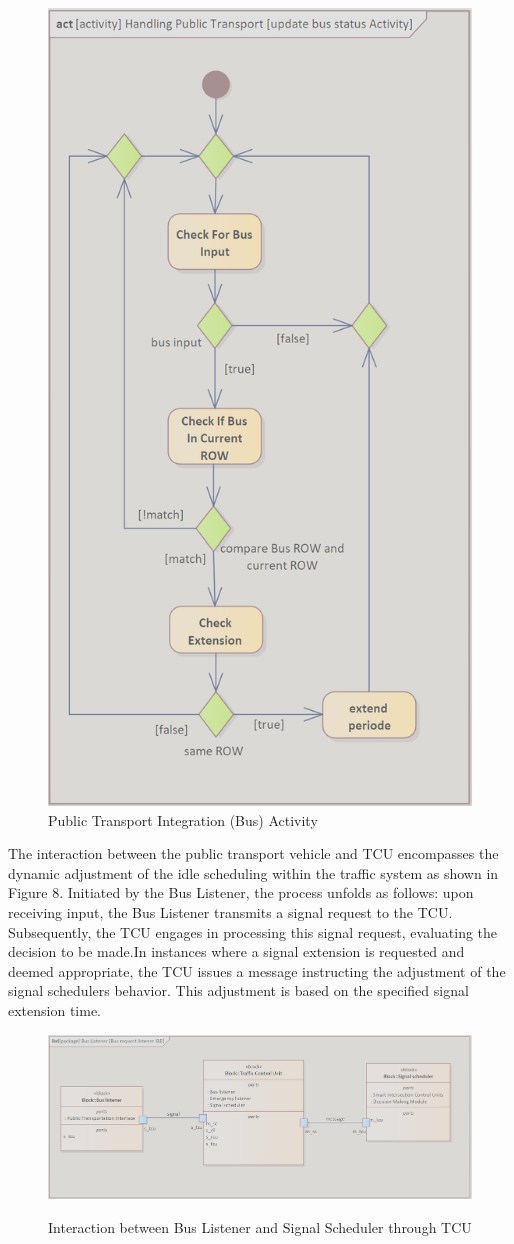 \begin{figure}
\centering
\includegraphics[width=0.5\linewidth]{images/process_1_activity.png}
\caption{Public Transport Integration (Bus) Activity}
\label{fig:bus_listener}
\end{figure}
The interaction between the public transport vehicle and TCU encompasses the dynamic adjustment of the idle scheduling within the traffic system as shown in Figure 8. Initiated by the Bus Listener, the process unfolds as follows: upon receiving input, the Bus Listener transmits a signal request to the TCU. Subsequently, the TCU engages in processing this signal request, evaluating the decision to be made.In instances where a signal extension is requested and deemed appropriate, the TCU issues a message instructing the adjustment of the signal schedulers behavior. This adjustment is based on the specified signal extension time. 
\begin{figure}
\centering
\includegraphics[width=1\linewidth]{images/bus_listener_ibd.png}
\label{fig:bus_listeneribd}
\caption{Interaction between Bus Listener and Signal Scheduler through TCU}
\end{figure}